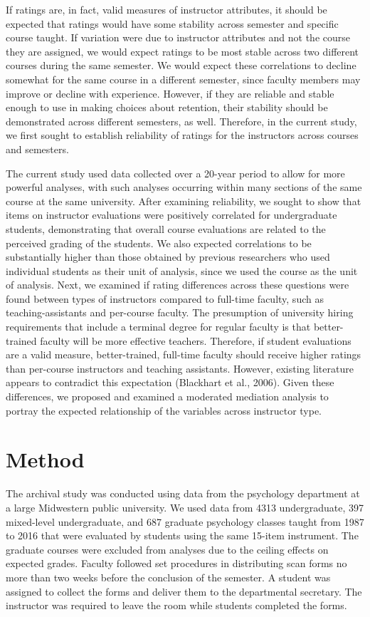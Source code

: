 \documentclass[man]{apa6}
\theoremstyle{definition}
\theoremstyle{definition}
\theoremstyle{definition}
\theoremstyle{remark}
\begin{document}
If ratings are, in fact, valid measures of instructor attributes, it
should be expected that ratings would have some stability across
semester and specific course taught. If variation were due to instructor
attributes and not the course they are assigned, we would expect ratings
to be most stable across two different courses during the same semester.
We would expect these correlations to decline somewhat for the same
course in a different semester, since faculty members may improve or
decline with experience. However, if they are reliable and stable enough
to use in making choices about retention, their stability should be
demonstrated across different semesters, as well. Therefore, in the
current study, we first sought to establish reliability of ratings for
the instructors across courses and semesters.

The current study used data collected over a 20-year period to allow for
more powerful analyses, with such analyses occurring within many
sections of the same course at the same university. After examining
reliability, we sought to show that items on instructor evaluations were
positively correlated for undergraduate students, demonstrating that
overall course evaluations are related to the perceived grading of the
students. We also expected correlations to be substantially higher than
those obtained by previous researchers who used individual students as
their unit of analysis, since we used the course as the unit of
analysis. Next, we examined if rating differences across these questions
were found between types of instructors compared to full-time faculty,
such as teaching-assistants and per-course faculty. The presumption of
university hiring requirements that include a terminal degree for
regular faculty is that better-trained faculty will be more effective
teachers. Therefore, if student evaluations are a valid measure,
better-trained, full-time faculty should receive higher ratings than
per-course instructors and teaching assistants. However, existing
literature appears to contradict this expectation (Blackhart et al.,
2006). Given these differences, we proposed and examined a moderated
mediation analysis to portray the expected relationship of the variables
across instructor type.

\section{Method}\label{method}

The archival study was conducted using data from the psychology
department at a large Midwestern public university. We used data from
4313 undergraduate, 397 mixed-level undergraduate, and 687 graduate
psychology classes taught from 1987 to 2016 that were evaluated by
students using the same 15-item instrument. The graduate courses were
excluded from analyses due to the ceiling effects on expected grades.
Faculty followed set procedures in distributing scan forms no more than
two weeks before the conclusion of the semester. A student was assigned
to collect the forms and deliver them to the departmental secretary. The
instructor was required to leave the room while students completed the
forms.
\end{document}

